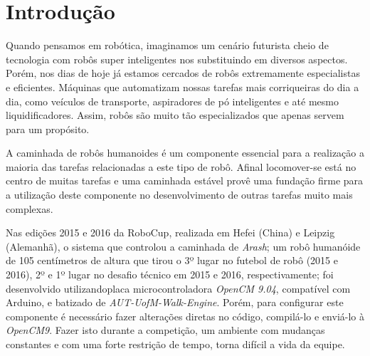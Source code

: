 \chapter{Introdução}








Quando pensamos em robótica, imaginamos um cenário futurista cheio de tecnologia
com robôs super inteligentes nos substituindo em diversos aspectos. Porém,
nos dias de hoje já estamos cercados de robôs extremamente especialistas e
eficientes. Máquinas que automatizam nossas tarefas mais corriqueiras do dia
a dia, como veículos de transporte, aspiradores de pó inteligentes e até
mesmo liquidificadores. Assim, robôs são muito tão especializados que apenas
servem para um propósito.

A caminhada de robôs humanoides é um componente essencial para a realização 
a maioria das tarefas relacionadas a este tipo de robô. Afinal locomover-se
está no centro de muitas tarefas e uma caminhada estável provê uma fundação
firme para a utilização deste componente no desenvolvimento de outras tarefas
muito mais complexas.


Nas edições 2015 e 2016 da RoboCup, realizada em Hefei (China) e Leipzig (Alemanhã),
o sistema que controlou a caminhada de \textit{Arash}; um robô humanóide de
105 centímetros de altura que tirou o 3º lugar no futebol de robô (2015 e 2016),
2º e 1º lugar no desafio técnico em 2015 e 2016, respectivamente; foi desenvolvido
utilizandoplaca microcontroladora \textit{OpenCM 9.04}, compatível com Arduino,
e batizado de \textit{AUT-UofM-Walk-Engine}. Porém, para configurar este componente
é necessário fazer alterações diretas no código, compilá-lo e enviá-lo à \textit{OpenCM9}.
Fazer isto durante a competição, um ambiente com mudanças constantes e com uma forte
restrição de tempo, torna difícil a vida da equipe.


